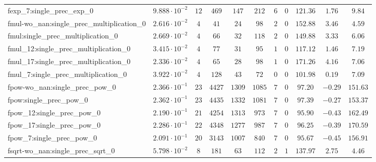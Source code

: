 \begin{tabular}{|l|c|c|c|c|c|c|c|c|c|c|}
fexp\_7:single\_prec\_exp\_0                   & $ 9.888 \cdot 10^{-2} $ & $ 12     $ & $ 469    $ & $ 147   $ & $ 212   $ & $ 6   $ & $ 0 $ & $ 121.36      $ & $ 1.76    $ & $ 9.84    $ \\
fmul-wo\_nan:single\_prec\_multiplication\_0   & $ 2.616 \cdot 10^{-2} $ & $ 4      $ & $ 41     $ & $ 24    $ & $ 98    $ & $ 2   $ & $ 0 $ & $ 152.88      $ & $ 3.46    $ & $ 4.59    $ \\
fmul:single\_prec\_multiplication\_0           & $ 2.669 \cdot 10^{-2} $ & $ 4      $ & $ 66     $ & $ 32    $ & $ 118   $ & $ 2   $ & $ 0 $ & $ 149.88      $ & $ 3.33    $ & $ 6.06    $ \\
fmul\_12:single\_prec\_multiplication\_0       & $ 3.415 \cdot 10^{-2} $ & $ 4      $ & $ 77     $ & $ 31    $ & $ 95    $ & $ 1   $ & $ 0 $ & $ 117.12      $ & $ 1.46    $ & $ 7.19    $ \\
fmul\_17:single\_prec\_multiplication\_0       & $ 2.336 \cdot 10^{-2} $ & $ 4      $ & $ 65     $ & $ 28    $ & $ 98    $ & $ 1   $ & $ 0 $ & $ 171.26      $ & $ 4.16    $ & $ 7.06    $ \\
fmul\_7:single\_prec\_multiplication\_0        & $ 3.922 \cdot 10^{-2} $ & $ 4      $ & $ 128    $ & $ 43    $ & $ 72    $ & $ 0   $ & $ 0 $ & $ 101.98      $ & $ 0.19    $ & $ 7.09    $ \\
fpow-wo\_nan:single\_prec\_pow\_0              & $ 2.366 \cdot 10^{-1} $ & $ 23     $ & $ 4427   $ & $ 1309  $ & $ 1085  $ & $ 7   $ & $ 0 $ & $ 97.20       $ & $ -0.29   $ & $ 151.63  $ \\
fpow:single\_prec\_pow\_0                      & $ 2.362 \cdot 10^{-1} $ & $ 23     $ & $ 4435   $ & $ 1332  $ & $ 1081  $ & $ 7   $ & $ 0 $ & $ 97.39       $ & $ -0.27   $ & $ 153.37  $ \\
fpow\_12:single\_prec\_pow\_0                  & $ 2.190 \cdot 10^{-1} $ & $ 21     $ & $ 4254   $ & $ 1313  $ & $ 973   $ & $ 7   $ & $ 0 $ & $ 95.90       $ & $ -0.43   $ & $ 162.49  $ \\
fpow\_17:single\_prec\_pow\_0                  & $ 2.286 \cdot 10^{-1} $ & $ 22     $ & $ 4348   $ & $ 1277  $ & $ 987   $ & $ 7   $ & $ 0 $ & $ 96.25       $ & $ -0.39   $ & $ 170.59  $ \\
fpow\_7:single\_prec\_pow\_0                   & $ 2.091 \cdot 10^{-1} $ & $ 20     $ & $ 3143   $ & $ 1007  $ & $ 840   $ & $ 7   $ & $ 0 $ & $ 95.67       $ & $ -0.45   $ & $ 156.91  $ \\
fsqrt-wo\_nan:single\_prec\_sqrt\_0            & $ 5.798 \cdot 10^{-2} $ & $ 8      $ & $ 181    $ & $ 63    $ & $ 112   $ & $ 2   $ & $ 1 $ & $ 137.97      $ & $ 2.75    $ & $ 4.46    $ \\

\end{tabular}
